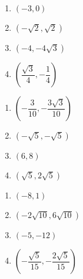\documentclass{ximera}
\begin{document}
\begin{multicols}{4} 

\begin{enumerate}

\setcounter{enumi}{\value{HW}}

\item $(-3, 0)$ 
\item $\left( -\sqrt{2}, \sqrt{2} \right)$ 
\item $\left( -4,-4\sqrt{3} \right)$ 
\item $\left( \dfrac{\sqrt{3}}{4}, -\dfrac{1}{4} \right)$

\setcounter{HW}{\value{enumi}}

\end{enumerate}

\end{multicols}

\begin{multicols}{4} 

\begin{enumerate}

\setcounter{enumi}{\value{HW}}

\item $\left( -\dfrac{3}{10}, -\dfrac{3\sqrt{3}}{10} \right)$
\item $\left( -\sqrt{5}, -\sqrt{5} \right)$ 
\item $(6,8)$ 
\item $(\sqrt{5},2\sqrt{5})$ 

\setcounter{HW}{\value{enumi}}

\end{enumerate}

\end{multicols}

\begin{multicols}{4} 

\begin{enumerate}

\setcounter{enumi}{\value{HW}}

\item $(-8,1)$ 
\item $(-2\sqrt{10}, 6\sqrt{10})$ 
\item $\left(-5, -12 \right)$ 
\item $\left(-\dfrac{\sqrt{5}}{15}, -\dfrac{2\sqrt{5}}{15}  \right)$

\setcounter{HW}{\value{enumi}}

\end{enumerate}

\end{multicols}
\end{document}
